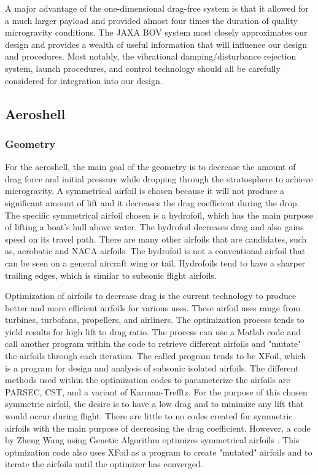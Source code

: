 A major advantage of the one-dimensional drag-free system is that it allowed for a much larger payload and provided almost four times the duration of quality microgravity conditions. The JAXA BOV system most closely approximates our design and provides a wealth of useful information that will influence our design and procedures. Most notably, the vibrational damping/disturbance rejection system, launch procedures, and control technology should all be carefully considered for integration into our design. 




\subsection{Aeroshell}

\subsubsection{Geometry}

\indent\indent For the aeroshell, the main goal of the geometry is to decrease the amount of drag force and initial pressure while dropping through the stratosphere to achieve microgravity. A symmetrical airfoil is chosen because it will not produce a significant amount of lift and it decreases the drag coefficient during the drop. The specific symmetrical airfoil chosen is a hydrofoil, which has the main purpose of lifting a boat's hull above water. The hydrofoil decreases drag and also gains speed on its travel path. There are many other airfoils that are candidates, such as, aerobatic and NACA airfoils. The hydrofoil is not a conventional airfoil that can be seen on a general aircraft wing or tail. Hydrofoils tend to have a sharper trailing edges, which is similar to subsonic flight airfoils.

Optimization of airfoils to decrease drag is the current technology to produce better and more efficient airfoils for various uses. These airfoil uses range from turbines, turbofans, propellers, and airliners. The optimization process tends to yield results for high lift to drag ratio. The process can use a Matlab code and call another program within the code to retrieve different airfoils and "mutate" the airfoils through each iteration. The called program tends to be XFoil, which is a program for design and analysis of subsonic isolated airfoils. The different methods used within the optimization codes to parameterize the airfoils are PARSEC, CST, and a variant of Karman-Trefftz. For the purpose of this chosen symmetric airfoil, the desire is to have a low drag and to minimize any lift that would occur during flight. There are little to no codes created for symmetric airfoils with the main purpose of decreasing the drag coefficient. However, a code by Zheng Wang using Genetic Algorithm optimizes symmetrical airfoils \cite{optimize}. This optmization code also uses XFoil as a program to create "mutated" airfoils and to iterate the airfoils until the optimizer has converged.

